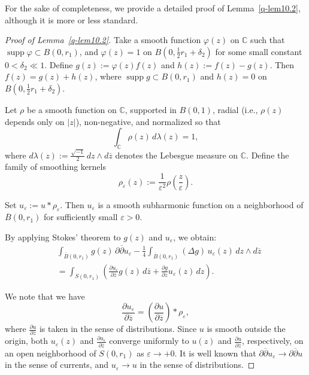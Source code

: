 \documentclass[12pt,twoside]{amsart}
\DeclareMathOperator{\supp}{supp}
\theoremstyle{definition}
\begin{document}
For the sake of completeness, we provide a detailed proof of Lemma~\ref{q-lem10.2}, 
although it is more or less standard.

\begin{proof}[Proof of Lemma~\ref{q-lem10.2}]
Take a smooth function \( \varphi(z) \) on \( \mathbb{C} \) such that 
\( \supp \varphi \subset B(0, r_1) \), and \( \varphi(z) = 1 \) on 
\( B(0, \tfrac{1}{2} r_1 + \delta_2) \) for some small constant 
\( 0 < \delta_2 \ll 1 \). Define \( g(z) := \varphi(z) f(z) \) and 
\( h(z) := f(z) - g(z) \). Then \( f(z) = g(z) + h(z) \), where 
\( \supp g \subset B(0, r_1) \) and \( h(z) = 0 \) on 
\( B(0, \tfrac{1}{2} r_1 + \delta_2) \).

Let \( \rho \) be a smooth function on \( \mathbb{C} \), supported in \( B(0,1) \), 
radial (i.e., \( \rho(z) \) depends only on \( |z| \)), non-negative, and normalized so that
\[
\int_{\mathbb{C}} \rho(z) \, d\lambda(z) = 1,
\]
where \( d\lambda(z) := \frac{\sqrt{-1}}{2} \, dz \wedge d\overline{z} \) 
denotes the Lebesgue measure on \( \mathbb{C} \). Define the family of smoothing kernels 
\[
\rho_\varepsilon(z) := \frac{1}{\varepsilon^2} \rho\left( \frac{z}{\varepsilon} \right).
\]

Set \( u_\varepsilon := u * \rho_\varepsilon \). 
Then \( u_\varepsilon \) is a smooth subharmonic 
function on a neighborhood of \( \overline{B}(0, r_1) \) 
for sufficiently small \( \varepsilon > 0 \).

By applying Stokes' theorem to \( g(z) \) and \( u_\varepsilon \), we obtain:
\begin{equation}\label{q-eq10.2} 
\begin{split}
&\int_{\overline{B}(0, r_1)} g(z) \, \partial \overline{\partial} u_{\varepsilon} 
- \frac{1}{4} \int_{\overline{B}(0, r_1)} 
(\Delta g) \, u_{\varepsilon}(z) \, dz \wedge d\overline{z} \\
&= \int_{S(0, r_1)} 
\left( \frac{\partial u_\varepsilon}{\partial \overline{z}} g(z) \, d\overline{z} 
+ \frac{\partial g}{\partial z} u_\varepsilon(z) \, dz \right).
\end{split}
\end{equation}

We note that we have 
\[
\frac{\partial u_\varepsilon}{\partial \overline{z}} = 
\left( \frac{\partial u}{\partial \overline{z}} \right) * \rho_\varepsilon, 
\] 
where \( \frac{\partial u}{\partial \overline{z}} \) is taken 
in the sense of distributions. Since \( u \) is smooth outside the origin, 
both \( u_\varepsilon(z) \) and \( \frac{\partial u_\varepsilon}{
\partial \overline{z}} \) converge uniformly to \( u(z) \) and 
\( \frac{\partial u}{\partial \overline{z}} \), 
respectively, on an open neighborhood of \(S(0, r_1)\) as \( \varepsilon \to +0\). 
It is well known that 
\( \partial \overline{\partial} u_\varepsilon \to \partial \overline{\partial} u \) 
in the sense of currents, and \( u_\varepsilon \to u \) in the sense of distributions.


\end{proof}
\end{document}
